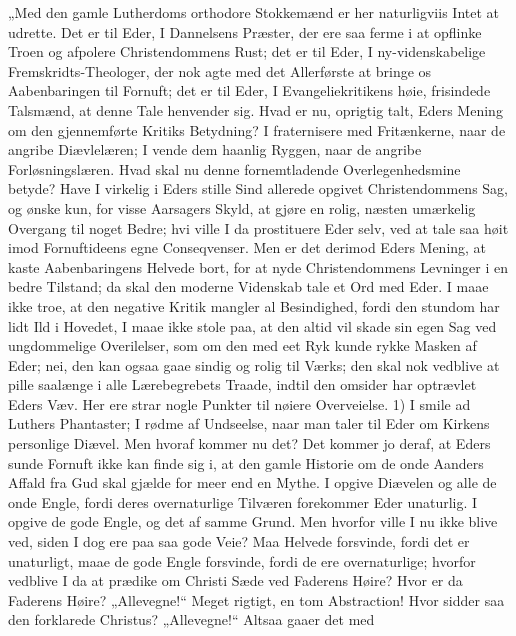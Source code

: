 \documentclass[12pt,a4paper]{book}
\begin{document}
„Med den gamle Lutherdoms orthodore Stokkemænd er her naturligviis Intet at udrette. Det
er til Eder, I Dannelsens Præster, der ere saa ferme i at opflinke Troen og afpolere
Christendommens Rust; det er til Eder, I ny-videnskabelige Fremskridts-Theologer, der nok
agte med det Allerførste at bringe os Aabenbaringen til Fornuft; det er til Eder, I
Evangeliekritikens høie, frisindede Talsmænd, at denne Tale henvender sig. Hvad er nu,
oprigtig talt, Eders Mening om den gjennemførte Kritiks Betydning? I fraternisere med
Fritænkerne, naar de angribe Diævlelæren; I vende dem haanlig Ryggen, naar de angribe
Forløsningslæren. Hvad skal nu denne fornemtladende Overlegenhedsmine betyde? Have I
virkelig i Eders stille Sind allerede opgivet Christendommens Sag, og ønske kun, for visse
Aarsagers Skyld, at gjøre en rolig, næsten umærkelig Overgang til noget Bedre; hvi ville I
da prostituere Eder selv, ved at tale saa høit imod Fornuftideens egne Conseqvenser. Men
er det derimod Eders Mening, at kaste Aabenbaringens Helvede bort, for at nyde
Christendommens Levninger i en bedre Tilstand; da skal den moderne Videnskab tale et Ord
med Eder. I maae ikke troe, at den negative Kritik mangler al Besindighed, fordi den
stundom har lidt Ild i Hovedet, I maae ikke stole paa, at den altid vil skade sin egen Sag
ved ungdommelige Overilelser, som om den med eet Ryk kunde rykke Masken af Eder; nei, den
kan ogsaa gaae sindig og rolig til Værks; den skal nok vedblive at pille saalænge i alle
Lærebegrebets Traade, indtil den omsider har optrævlet Eders Væv. Her ere strar nogle
Punkter til nøiere Overveielse. 1) I smile ad Luthers Phantaster; I rødme af Undseelse,
naar man taler til Eder om Kirkens personlige Diævel. Men hvoraf kommer nu det? Det
kommer jo deraf, at Eders sunde Fornuft ikke kan finde sig i, at den gamle Historie om de
onde Aanders Affald fra Gud skal gjælde for meer end en Mythe. I opgive Diævelen og alle
de onde Engle, fordi deres overnaturlige Tilværen forekommer Eder unaturlig. I opgive de
gode Engle, og det af samme Grund. Men hvorfor ville I nu ikke blive ved, siden I dog ere
paa saa gode Veie? Maa Helvede forsvinde, fordi det er unaturligt, maae de gode Engle
forsvinde, fordi de ere overnaturlige; hvorfor vedblive I da at prædike om Christi Sæde
ved Faderens Høire? Hvor er da Faderens Høire? „Allevegne!“ Meget rigtigt, en tom
Abstraction! Hvor sidder saa den forklarede Christus? „Allevegne!“ Altsaa gaaer det med
\end{document}
